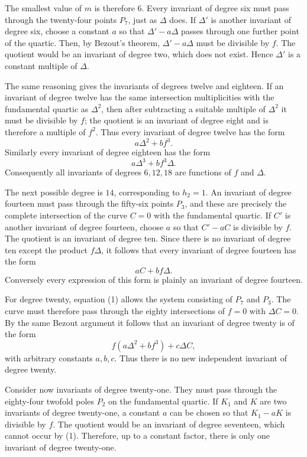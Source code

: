 \documentclass[12pt,a4paper]{article}
\begin{document}
The smallest value of \(m\) is therefore \(6\).  Every invariant of degree six must pass through the twenty-four points \(P_7\), just as \(\Delta\) does.  If \(\Delta'\) is another invariant of degree six, choose a constant \(a\) so that \(\Delta'-a\Delta\) passes through one further point of the quartic.  Then, by Bezout's theorem, \(\Delta'-a\Delta\) must be divisible by \(f\).  The quotient would be an invariant of degree two, which does not exist.  Hence \(\Delta'\) is a constant multiple of \(\Delta\).

The same reasoning gives the invariants of degrees twelve and eighteen.  If an invariant of degree twelve has the same intersection multiplicities with the fundamental quartic as \(\Delta^2\), then after subtracting a suitable multiple of \(\Delta^2\) it must be divisible by \(f\); the quotient is an invariant of degree eight and is therefore a multiple of \(f^2\).  Thus every invariant of degree twelve has the form
\[
 a\Delta^2+b f^3.
\]
Similarly every invariant of degree eighteen has the form
\[
 a\Delta^3+b f^3\Delta.
\]
Consequently all invariants of degrees \(6,12,18\) are functions of \(f\) and \(\Delta\).

The next possible degree is \(14\), corresponding to \(h_2=1\).  An invariant of degree fourteen must pass through the fifty-six points \(P_3\), and these are precisely the complete intersection of the curve \(C=0\) with the fundamental quartic.  If \(C'\) is another invariant of degree fourteen, choose \(a\) so that \(C'-aC\) is divisible by \(f\).  The quotient is an invariant of degree ten.  Since there is no invariant of degree ten except the product \(f\Delta\), it follows that every invariant of degree fourteen has the form
\[
 aC+bf\Delta.
\]
Conversely every expression of this form is plainly an invariant of degree fourteen.

For degree twenty, equation (1) allows the system consisting of \(P_7\) and \(P_3\).  The curve must therefore pass through the eighty intersections of \(f=0\) with \(\Delta C=0\).  By the same Bezout argument it follows that an invariant of degree twenty is of the form
\[
 f(a\Delta^2+b f^3)+c\Delta C,
\]
with arbitrary constants \(a,b,c\).  Thus there is no new independent invariant of degree twenty.

Consider now invariants of degree twenty-one.  They must pass through the eighty-four twofold poles \(P_2\) on the fundamental quartic.  If \(K_1\) and \(K\) are two invariants of degree twenty-one, a constant \(a\) can be chosen so that \(K_1-aK\) is divisible by \(f\).  The quotient would be an invariant of degree seventeen, which cannot occur by (1).  Therefore, up to a constant factor, there is only one invariant of degree twenty-one.
\end{document}
